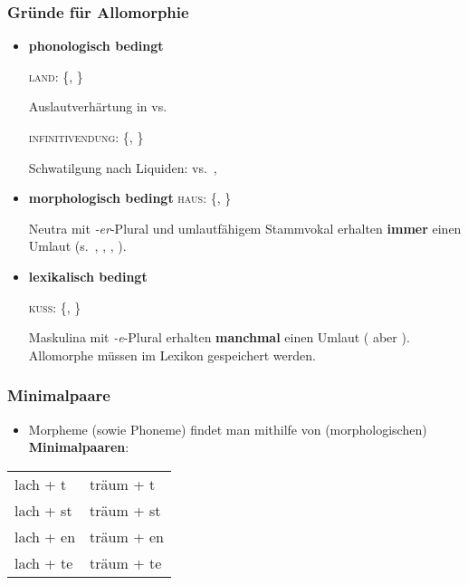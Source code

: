 \begin{frame}
\frametitle{Gründe für Allomorphie}

\begin{itemize}
	\item \textbf{phonologisch bedingt} 
	
	\ea 
	
	\ea \textsc{land}: \{, \}

	Auslautverhärtung in  vs. 
	
	\ex \textsc{infinitivendung}: \{\textipa{[n]}, \textipa{[\alertred{@}n]}\}
	
	Schwatilgung nach Liquiden:  vs.\ , 
	\z
	\z 

\pause 

	\item \textbf{morphologisch bedingt}
	\ea \textsc{haus}: \{\textipa{[h\alertred{\t{aU}}s]}, \textipa{[h\alertred{\t{O}I}s]}\}
	
	Neutra mit \emph{-er}-Plural und umlautfähigem Stammvokal erhalten \textbf{immer} einen Umlaut (s.\ , , , ).
	\z 

\pause 

	\item \textbf{lexikalisch bedingt}
	
	\ea \textsc{kuss}: \{\textipa{[k\alertred{U}s]}, \textipa{[k\alertred{Y}s]}\}
	
	Maskulina mit \emph{-e}-Plural erhalten \textbf{manchmal} einen Umlaut ( aber ). Allomorphe müssen im Lexikon gespeichert werden.
	\z 
	
\end{itemize}

\end{frame}


\begin{frame}
\frametitle{Minimalpaare}

\begin{itemize}
	\item Morpheme (sowie Phoneme) findet man mithilfe von (morphologischen) \textbf{Minimalpaaren}:
\end{itemize}

\begin{table}
\begin{tabular}{l | l}
lach + t  & träum + t \\
lach + st & träum + st \\
lach + en & träum + en \\
lach + te & träum + te \\
\end{tabular}
\end{table}

\end{frame}


